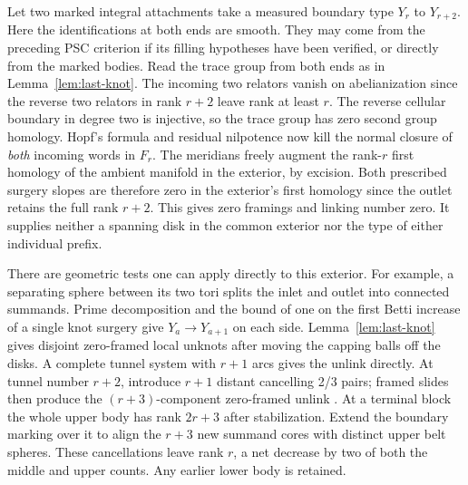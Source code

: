 \documentclass[11pt,letterpaper]{article}
\numberwithin{equation}{section}
\theoremstyle{remark}
\begin{document}
Let two marked integral attachments take a measured boundary type
\(Y_r\) to \(Y_{r+2}\). Here the identifications at both ends are
smooth. They may come from the preceding PSC criterion if its filling
hypotheses have been verified, or directly from the marked bodies.
Read the trace group from both ends as in Lemma~\ref{lem:last-knot}.
The incoming two relators vanish on abelianization since the reverse
two relators in rank \(r+2\) leave rank at least \(r\). The reverse
cellular boundary in degree two is injective, so the trace group has
zero second group homology. Hopf's formula and residual nilpotence
now kill the normal closure of \emph{both} incoming words in \(F_r\).
The meridians freely augment the rank-\(r\) first homology of the
ambient manifold in the exterior, by excision. Both prescribed surgery
slopes are therefore zero in the exterior's first homology since the
outlet retains the full rank \(r+2\). This gives zero framings and
linking number zero. It supplies neither a spanning disk in the common
exterior nor the type of either individual prefix.

There are geometric tests one can apply directly to this exterior.
For example, a separating sphere between its two tori splits the inlet
and outlet into connected summands. Prime decomposition and the bound
of one on the first Betti increase of a single knot surgery give
\(Y_a\to Y_{a+1}\) on each side. Lemma~\ref{lem:last-knot} gives
disjoint zero-framed local unknots after moving the capping balls off
the disks. A complete tunnel system with \(r+1\) arcs gives the unlink
directly. At tunnel number \(r+2\), introduce \(r+1\) distant cancelling
2/3 pairs; framed slides then produce the \((r+3)\)-component
zero-framed unlink \cite[Corollary 1.3]{MeierSchirmerZupan2016Trisections}.
At a terminal block the whole upper body has rank \(2r+3\) after
stabilization. Extend the boundary marking over it to align the
\(r+3\) new summand cores with distinct upper belt spheres. These
cancellations leave rank \(r\), a net decrease by two of both the
middle and upper counts. Any earlier lower body is retained.
\end{document}
